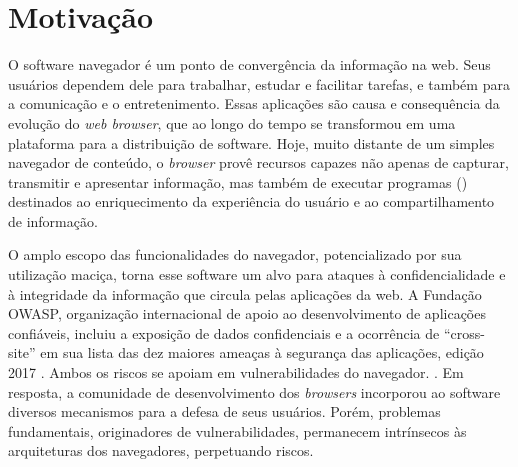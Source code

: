 \section{Motivação}


O software navegador é um ponto de convergência da informação na web. Seus usuários dependem dele para trabalhar, estudar e facilitar tarefas, e também para a comunicação e o entretenimento. Essas aplicações são causa e consequência da evolução do \textit{web browser}, que ao longo do tempo se transformou em uma plataforma para a distribuição de software. Hoje, muito distante de um simples navegador de conteúdo, o \textit{browser} provê recursos capazes não apenas de capturar, transmitir e apresentar informação, mas também de executar programas (\scripts{}) destinados ao enriquecimento da experiência do usuário e ao compartilhamento de informação.

O amplo escopo das funcionalidades do navegador, potencializado por sua utilização maciça, torna esse software um alvo para ataques à confidencialidade e à integridade da informação que circula pelas aplicações da web. A Fundação OWASP, organização internacional de apoio ao desenvolvimento de aplicações confiáveis, incluiu a exposição de dados confidenciais e a ocorrência de \scripts{} ``cross-site''  em sua lista das dez maiores ameaças à segurança das aplicações, edição 2017 \cite{OWASP:Top10}. Ambos os riscos se apoiam em vulnerabilidades do navegador. . Em resposta, a comunidade de desenvolvimento dos \textit{browsers} incorporou ao software diversos mecanismos para a defesa de seus usuários. Porém, problemas fundamentais, originadores de vulnerabilidades, permanecem intrínsecos às arquiteturas dos navegadores, perpetuando riscos.

